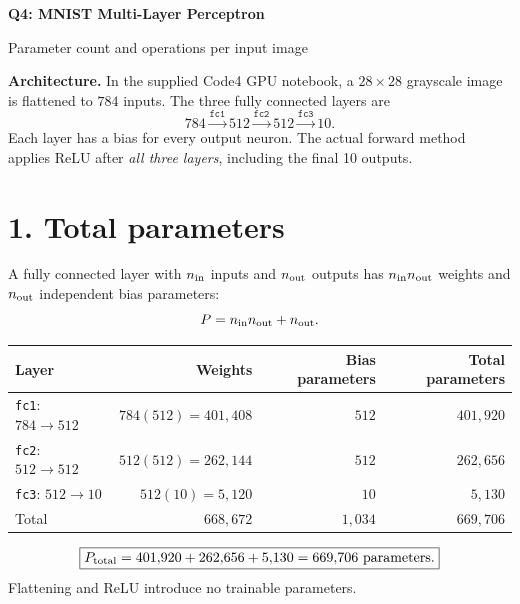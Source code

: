\documentclass[10pt]{article}
\begin{document}
\begin{center}
{\Large\bfseries Q4: MNIST Multi-Layer Perceptron}\par
Parameter count and operations per input image
\end{center}

\textbf{Architecture.} In the supplied Code4 GPU notebook, a $28\times28$
grayscale image is flattened to $784$ inputs. The three fully connected
layers are
\[
784\xrightarrow{\texttt{fc1}}512
\xrightarrow{\texttt{fc2}}512
\xrightarrow{\texttt{fc3}}10.
\]
Each layer has a bias for every output neuron. The actual forward method
applies ReLU after \emph{all three layers}, including the final 10 outputs.

\section*{1. Total parameters}
A fully connected layer with $n_{\rm in}$ inputs and $n_{\rm out}$ outputs has
$n_{\rm in}n_{\rm out}$ weights and $n_{\rm out}$ independent bias parameters:
\[
P=n_{\rm in}n_{\rm out}+n_{\rm out}.
\]
\begin{center}
\begin{tabular}{lrrr}
\toprule
Layer & Weights & Bias parameters & Total parameters\\
\midrule
\texttt{fc1}: $784\to512$ & $784(512)=401{,}408$ & $512$ & $401{,}920$\\
\texttt{fc2}: $512\to512$ & $512(512)=262{,}144$ & $512$ & $262{,}656$\\
\texttt{fc3}: $512\to10$ & $512(10)=5{,}120$ & $10$ & $5{,}130$\\
\midrule
Total & $668{,}672$ & $1{,}034$ & $669{,}706$\\
\bottomrule
\end{tabular}
\end{center}
\[
\boxed{P_{\rm total}=401{,}920+262{,}656+5{,}130
 =669{,}706\text{ parameters}.}
\]
Flattening and ReLU introduce no trainable parameters.
\end{document}
